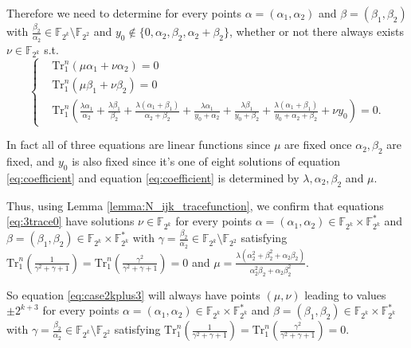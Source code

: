 \documentclass[runningheads,a4paper]{article}
\newcommand{\F}{\mathbb{F}}
\newcommand{\0}{\textbf{0}}
\newcommand{\1}{\textbf{1}}
\renewcommand{\Tr}{\mathrm{Tr}_1^n}
\begin{document}
    Therefore we need to determine for every points $ \alpha=(\alpha_1,\alpha_2) $ and $ \beta=(\beta_1,\beta_2) $ 
    with $ \frac{\beta_2}{\alpha_2}\in\F_{2^k}\setminus\F_{2^2} $ and $ y_0\notin\{0,\alpha_2,\beta_2,\alpha_2+\beta_2\} $, 
    whether or not there always exists $ \nu\in\F_{2^k} $ s.t. 
    \begin{equation}\label{eq:3trace0}\left\{\begin{alignedat}{3}
        &\Tr\left(\mu\alpha_1+\nu\alpha_2\right)=0\\ 
        &\Tr\left(\mu\beta_1+\nu\beta_2\right)=0\\
        &\Tr\left(\frac{\lambda\alpha_1}{\alpha_2}+\frac{\lambda\beta_1}{\beta_2}+\frac{\lambda(\alpha_1+\beta_1)}{\alpha_2+\beta_2}+\frac{\lambda\alpha_1}{y_0+\alpha_2}+\frac{\lambda\beta_1}{y_0+\beta_2}+\frac{\lambda(\alpha_1+\beta_1)}{y_0+\alpha_2+\beta_2}+\nu y_0\right)=0.
    \end{alignedat}\right.\end{equation}

    In fact  all of three equations are linear functions  since $ \mu $ are fixed once $ \alpha_2,\beta_2 $ are fixed, and 
    $ y_0 $ is also fixed since it's one of eight solutions of equation \eqref{eq:coefficient} and equation \eqref{eq:coefficient} is 
    determined by $ \lambda,\alpha_2,\beta_2 $ and $ \mu $. 
    
    Thus, using Lemma \ref{lemma:N_ijk_tracefunction}, we confirm that equations \eqref{eq:3trace0} have   solutions $ \nu\in\F_{2^k} $
    for every points $ \alpha=(\alpha_1,\alpha_2)\in\F_{2^k}\times\F_{2^k}^* $ and $ \beta=(\beta_1,\beta_2)\in\F_{2^k}\times\F_{2^k}^* $ 
    with $ \gamma=\frac{\beta_2}{\alpha_2}\in\F_{2^k}\setminus\F_{2^2} $ satisfying 
    $ \Tr\left(\frac{1}{\gamma^2+\gamma+1}\right)=\Tr\left(\frac{\gamma^2}{\gamma^2+\gamma+1}\right)=0 $ 
    and $ \mu=\frac{\lambda(\alpha_2^2+\beta_2^2+\alpha_2\beta_2)}{\alpha_2^2\beta_2+\alpha_2\beta_2^2} $.
    
 


    So equation \eqref{eq:case2kplus3} will always have points $ (\mu,\nu) $ leading to values $ \pm 2^{k+3} $ for every points 
    $ \alpha=(\alpha_1,\alpha_2)\in\F_{2^k}\times\F_{2^k}^* $ and $ \beta=(\beta_1,\beta_2)\in\F_{2^k}\times\F_{2^k}^* $ 
    with $ \gamma=\frac{\beta_2}{\alpha_2}\in\F_{2^k}\setminus\F_{2^2} $ satisfying 
    $ \Tr\left(\frac{1}{\gamma^2+\gamma+1}\right)=\Tr\left(\frac{\gamma^2}{\gamma^2+\gamma+1}\right)=0 $.

 
\end{document}
